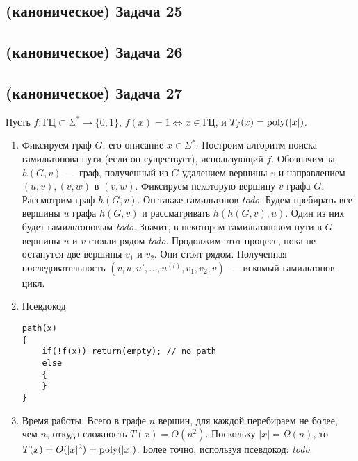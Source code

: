 \documentclass[a4paper]{article}
\def\poly{{\rm{poly}}}
\def\GC{{\mbox{ГЦ}}}
\newcommand{\todo}{{\em todo}}
\begin{document}
\subsection*{(каноническое) Задача 25}
\subsection*{(каноническое) Задача 26}
\subsection*{(каноническое) Задача 27}
Пусть $f\colon \GC\subset\Sigma^*\to\{0,1\}$, $f(x)=1\Leftrightarrow x\in\GC$, и $T_f(x)=\poly(|x|)$.
\begin{enumerate}
\item Фиксируем граф $G$, его описание $x\in\Sigma^*$. Построим алгоритм поиска гамильтонова пути (если он существует), использующий $f$. Обозначим за $h(G, v)$~--- граф, полученный из $G$ удалением вершины $v$ и направлением $(u,v), (v, w)$ в $(v, w)$. Фиксируем некоторую вершину $v$ графа $G$. Рассмотрим граф $h(G,v)$. Он также гамильтонов \todo. Будем пребирать все вершины $u$ графа $h(G,v)$ и рассматривать $h(h(G,v),u)$. Один из них будет гамильтоновым \todo. Значит, в некотором гамильтоновом пути в $G$ вершины $u$ и $v$ стояли рядом \todo. Продолжим этот процесс, пока не останутся две вершины $v_1$ и $v_2$. Они стоят рядом. Полученная последовательность $(v,u,u',...,u^{(l)},v_1,v_2,v)$~--- искомый гамильтонов цикл.
\item Псевдокод
\begin{lstlisting}
path(x)
{
    if(!f(x)) return(empty); // no path
    else
    {
    }
}
\end{lstlisting}
\item Время работы. Всего в графе $n$ вершин, для каждой перебираем не более, чем $n$, откуда сложность $T(x)=O(n^2)$. Поскольку $|x|=\Omega(n)$, то $T(x)=O(|x|^2)=\poly(|x|)$. Более точно, используя псевдокод: \todo.
\end{enumerate}
\end{document}

